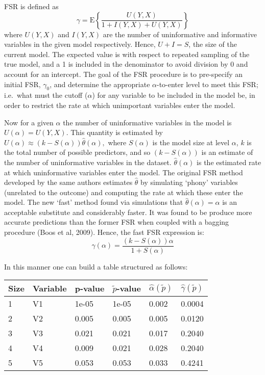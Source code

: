 \documentclass{article}
\begin{document}
FSR is defined as
\[ \gamma = \mathrm{E}\left\{\frac{U(Y,X)}{1 + I(Y,X) + U(Y,X)}\right\} \]
where $U(Y,X)$ and $I(Y,X)$ are the number of uninformative and
informative variables in the given model respectively. Hence,
$U + I = S$, the size of the current model. The expected value is with
respect to repeated sampling of the true model, and a 1 is included in
the denominator to avoid division by 0 and account for an intercept. The
goal of the FSR procedure is to pre-specify an initial FSR, $\gamma_0$,
and determine the appropriate $\alpha$-to-enter level to meet this FSR;
i.e.~what must the cutoff ($\alpha$) for any variable to be included in
the model be, in order to restrict the rate at which unimportant
variables enter the model.

Now for a given $\alpha$ the number of uninformative variables in the
model is $U(\alpha) = U(Y,X)$. This quantity is estimated by
$U(\alpha) \approx (k - S(\alpha)) \hat{\theta}(\alpha),$ where
$S(\alpha)$ is the model size at level $\alpha$, $k$ is the total number
of possible predictors, and so $(k - S(\alpha))$ is an estimate of the
number of uninformative variables in the dataset. $\hat{\theta}(\alpha)$
is the estimated rate at which uninformative variables enter the model.
The original FSR method developed by the same authors estimates
$\hat{\theta}$ by simulating `phony' variables (unrelated to the
outcome) and computing the rate at which these enter the model. The new
`fast' method found via simulations that $\hat{\theta}(\alpha) = \alpha$
is an acceptable substitute and considerably faster. It was found to be
produce more accurate predictions than the former FSR when coupled with
a bagging procedure (Boos et al, 2009). Hence, the fast FSR expression
is:
\[ \hat{\gamma}(\alpha) = \frac{(k - S(\alpha))\alpha}{1+S(\alpha)} \]

In this manner one can build a table structured as follows:

\begin{center}
\begin{tabular}{l|l|l|l|l|l}
    \hline
    Size & Variable & p-value & $\tilde{p}$-value & $\hat{\alpha}(\tilde{p})$ & $\hat{\gamma}(\tilde{p})$ \\
    \hline
    1 & V1 & 1e-05 & 1e-05 & 0.002 & 0.0004 \\
    2 & V2 & 0.005 & 0.005 & 0.005 & 0.0120 \\
    3 & V3 & 0.021 & 0.021 & 0.017 & 0.2040 \\
    4 & V4 & 0.009 & 0.021 & 0.028 & 0.2040 \\
    5 & V5 & 0.053 & 0.053 & 0.033 & 0.4241 \\
    \hline
\end{tabular}
\end{center}
\end{document}
